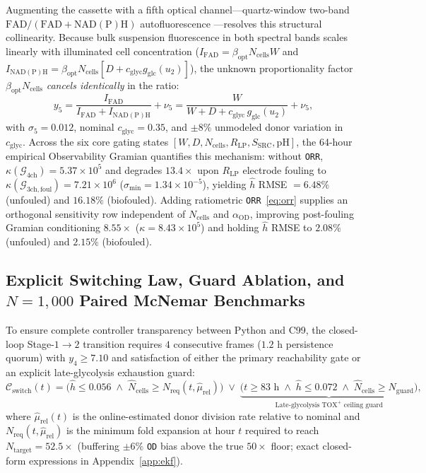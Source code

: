 \documentclass[11pt]{article}
\theoremstyle{plain}
\theoremstyle{remark}
\begin{document}
Augmenting the cassette with a fifth optical channel---quartz-window two-band $\mathrm{FAD}/(\mathrm{FAD} + \mathrm{NAD(P)H})$ autofluorescence \cite{walsh2021omi}---resolves this structural collinearity. Because bulk suspension fluorescence in both spectral bands scales linearly with illuminated cell concentration ($I_{\mathrm{FAD}} = \beta_{\mathrm{opt}} N_{\mathrm{cells}} W$ and $I_{\mathrm{NAD(P)H}} = \beta_{\mathrm{opt}} N_{\mathrm{cells}}[D + c_{\mathrm{glyc}} g_{\mathrm{glc}}(u_2)]$), the unknown proportionality factor $\beta_{\mathrm{opt}} N_{\mathrm{cells}}$ \emph{cancels identically} in the ratio:
\begin{equation}
  y_5 = \frac{I_{\mathrm{FAD}}}{I_{\mathrm{FAD}} + I_{\mathrm{NAD(P)H}}} + \nu_5 = \frac{W}{W + D + c_{\mathrm{glyc}}\,g_{\mathrm{glc}}(u_2)} + \nu_5,
  \label{eq:orr}
\end{equation}
with $\sigma_5 = 0.012$, nominal $c_{\mathrm{glyc}} = 0.35$, and $\pm 8\%$ unmodeled donor variation in $c_{\mathrm{glyc}}$. Across the six core gating states $[W, D, N_{\mathrm{cells}}, R_{\mathrm{LP}}, S_{\mathrm{SRC}}, \mathrm{pH}]$, the 64-hour empirical Observability Gramian quantifies this mechanism: without \texttt{ORR}, $\kappa(\mathcal{G}_{4\mathrm{ch}}) = 5.37 \times 10^5$ and degrades $13.4\times$ upon $R_{\mathrm{LP}}$ electrode fouling to $\kappa(\mathcal{G}_{3\mathrm{ch,foul}}) = 7.21 \times 10^6$ ($\sigma_{\min} = 1.34 \times 10^{-5}$), yielding $\hat{h}$ RMSE $= 6.48\%$ (unfouled) and $16.18\%$ (biofouled). Adding ratiometric \texttt{ORR}~\eqref{eq:orr} supplies an orthogonal sensitivity row independent of $N_{\mathrm{cells}}$ and $\alpha_{\mathrm{OD}}$, improving post-fouling Gramian conditioning $8.55\times$ ($\kappa = 8.43 \times 10^5$) and holding $\hat{h}$ RMSE to $2.08\%$ (unfouled) and $2.15\%$ (biofouled).

\subsection{Explicit Switching Law, Guard Ablation, and $N = 1{,}000$ Paired McNemar Benchmarks}
To ensure complete controller transparency between Python and C99, the closed-loop Stage-$1 \to 2$ transition requires $4$ consecutive frames ($1.2\text{ h}$ persistence quorum) with $y_4 \ge 7.10$ and satisfaction of either the primary reachability gate or an explicit late-glycolysis exhaustion guard:
\begin{equation}
  \mathcal{C}_{\mathrm{switch}}(t) = \big(\hat{h} \le 0.056 \;\wedge\; \hat{N}_{\mathrm{cells}} \ge N_{\mathrm{req}}(t, \hat{\mu}_{\mathrm{rel}})\big) \;\vee\; \underbrace{\big(t \ge 83\text{ h} \;\wedge\; \hat{h} \le 0.072 \;\wedge\; \hat{N}_{\mathrm{cells}} \ge N_{\mathrm{guard}}\big)}_{\text{Late-glycolysis }\mathrm{TOX}^+\text{ ceiling guard}},
  \label{eq:switch_law}
\end{equation}
where $\hat{\mu}_{\mathrm{rel}}(t)$ is the online-estimated donor division rate relative to nominal and $N_{\mathrm{req}}(t, \hat{\mu}_{\mathrm{rel}})$ is the minimum fold expansion at hour $t$ required to reach $N_{\mathrm{target}} = 52.5\times$ (buffering $\pm 6\%$ \texttt{OD} bias above the true $50\times$ floor; exact closed-form expressions in Appendix~\ref{app:ekf}).
\end{document}
